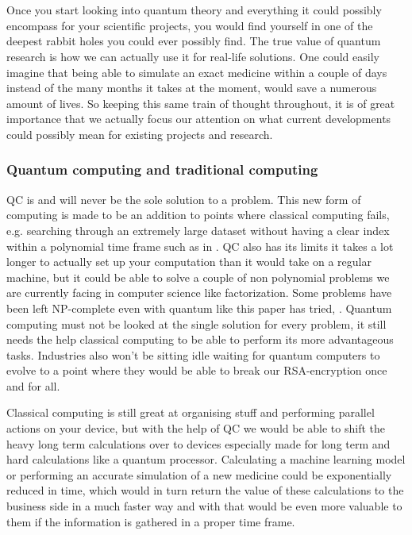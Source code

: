 
\chapter{}
\label{ch:computing-with-quantum}

Once you start looking into quantum theory and everything it could possibly encompass for your scientific projects, you would find yourself in one of the deepest rabbit holes you could ever possibly find. The true value of quantum research is how we can actually use it for real-life solutions. One could easily imagine that being able to simulate an exact medicine within a couple of days instead of the many months it takes at the moment, would save a numerous amount of lives. So keeping this same train of thought throughout, it is of great importance that we actually focus our attention on what current developments could possibly mean for existing projects and research.

\subsection{Quantum computing and traditional computing}

QC is and will never be the sole solution to a problem. This new form of computing is made to be an addition to points where classical computing fails, e.g. searching through an extremely large dataset without having a clear index within a polynomial time frame such as in \textcite{Terhal1998}. QC also has its limits it takes a lot longer to actually set up your computation than it would take on a regular machine, but it could be able to solve a couple of non polynomial problems we are currently facing in computer science like factorization. 
Some problems have been left NP-complete even with quantum like this paper has tried, \textcite{Wang2007}. Quantum computing must not be looked at the single solution for every problem, it still needs the help classical computing to be able to perform its more advantageous tasks. Industries also won't be sitting idle waiting for quantum computers to evolve to a point where they would be able to break our RSA-encryption once and for all. 

Classical computing is still great at organising stuff and performing parallel actions on your device, but with the help of QC we would be able to shift the heavy long term calculations over to devices especially made for long term and hard calculations like a quantum processor. Calculating a machine learning model \textcite{Schuld2014} or performing an accurate simulation of a new medicine could be exponentially reduced in time, which would in turn return the value of these calculations to the business side in a much faster way and with that would be even more valuable to them if the information is gathered in a proper time frame. \autocite{Schuld2015} \autocite{Troyer2005}

